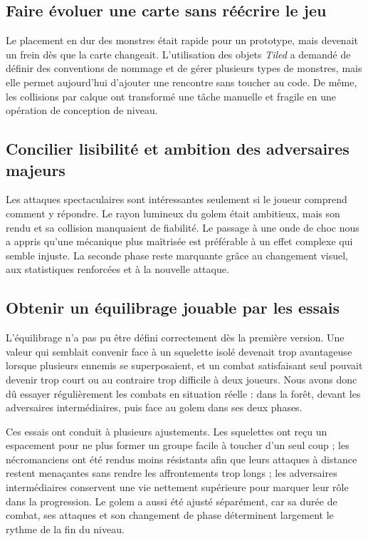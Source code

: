 \documentclass[a4paper,12pt]{article}
\begin{document}
\subsection{Faire évoluer une carte sans réécrire le jeu}

Le placement en dur des monstres était rapide pour un prototype, mais devenait un
frein dès que la carte changeait. L'utilisation des objets \textit{Tiled} a demandé de définir
des conventions de nommage et de gérer plusieurs types de monstres, mais elle permet
aujourd'hui d'ajouter une rencontre sans toucher au code. De même, les collisions par
calque ont transformé une tâche manuelle et fragile en une opération de conception de niveau.

\subsection{Concilier lisibilité et ambition des adversaires majeurs}

Les attaques spectaculaires sont intéressantes seulement si le joueur comprend comment
y répondre. Le rayon lumineux du golem était ambitieux, mais son rendu et sa collision
manquaient de fiabilité. Le passage à une onde de choc nous a appris qu'une mécanique
plus maîtrisée est préférable à un effet complexe qui semble injuste. La seconde phase
reste marquante grâce au changement visuel, aux statistiques renforcées et à la
nouvelle attaque.

\subsection{Obtenir un équilibrage jouable par les essais}

L'équilibrage n'a pas pu être défini correctement dès la première version. Une valeur
qui semblait convenir face à un squelette isolé devenait trop avantageuse lorsque
plusieurs ennemis se superposaient, et un combat satisfaisant seul pouvait devenir trop
court ou au contraire trop difficile à deux joueurs. Nous avons donc dû essayer
régulièrement les combats en situation réelle : dans la forêt, devant les adversaires
intermédiaires, puis face au golem dans ses deux phases.

Ces essais ont conduit à plusieurs ajustements. Les squelettes ont reçu un espacement
pour ne plus former un groupe facile à toucher d'un seul coup ; les nécromanciens ont
été rendus moins résistants afin que leurs attaques à distance restent menaçantes sans
rendre les affrontements trop longs ; les adversaires intermédiaires conservent une
vie nettement supérieure pour marquer leur rôle dans la progression. Le golem a aussi
été ajusté séparément, car sa durée de combat, ses attaques et son changement de phase
déterminent largement le rythme de la fin du niveau.
\end{document}
